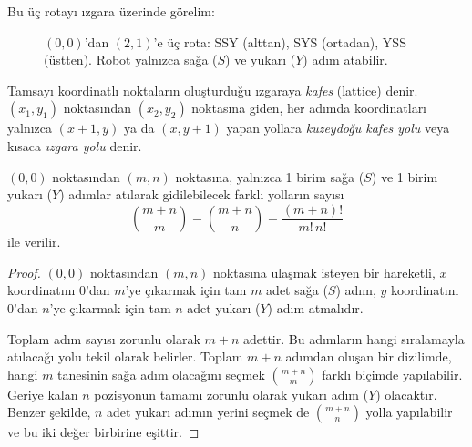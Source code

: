 Bu üç rotayı ızgara üzerinde görelim:

\begin{figure}[ht]
\centering
{}
\caption{$(0,0)$'dan $(2,1)$'e üç rota: SSY (alttan), SYS (ortadan), YSS
(üstten). Robot yalnızca sağa ($S$) ve yukarı ($Y$) adım atabilir.}
\end{figure}

\begin{definition}
Tamsayı koordinatlı noktaların oluşturduğu ızgaraya \emph{kafes} (lattice) denir. $(x_1, y_1)$ noktasından $(x_2, y_2)$ noktasına giden, her adımda koordinatları yalnızca $(x+1, y)$ ya da $(x, y+1)$ yapan yollara \emph{kuzeydoğu kafes yolu} veya kısaca \emph{ızgara yolu} denir.
\end{definition}

\begin{theorem}
$(0,0)$ noktasından $(m,n)$ noktasına, yalnızca 1 birim sağa ($S$) ve 1 birim yukarı ($Y$) adımlar atılarak gidilebilecek farklı yolların sayısı
\[
\binom{m+n}{m} = \binom{m+n}{n} = \frac{(m+n)!}{m! \, n!}
\]
ile verilir.
\end{theorem}

\begin{proof}
$(0,0)$ noktasından $(m,n)$ noktasına ulaşmak isteyen bir hareketli, $x$ koordinatını 0'dan $m$'ye çıkarmak için tam $m$ adet sağa ($S$) adım, $y$ koordinatını 0'dan $n$'ye çıkarmak için tam $n$ adet yukarı ($Y$) adım atmalıdır. 

Toplam adım sayısı zorunlu olarak $m+n$ adettir. Bu adımların hangi sıralamayla atılacağı yolu tekil olarak belirler. Toplam $m+n$ adımdan oluşan bir dizilimde, hangi $m$ tanesinin sağa adım olacağını seçmek $\binom{m+n}{m}$ farklı biçimde yapılabilir. Geriye kalan $n$ pozisyonun tamamı zorunlu olarak yukarı adım ($Y$) olacaktır. Benzer şekilde, $n$ adet yukarı adımın yerini seçmek de $\binom{m+n}{n}$ yolla yapılabilir ve bu iki değer birbirine eşittir.
\end{proof}

